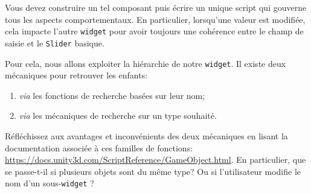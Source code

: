 \documentclass[a4paper,10pt]{article}
\begin{document}
Vous devez construire un tel composant puis écrire un unique script qui gouverne tous les aspects comportementaux. En particulier, lorsqu'une valeur est modifiée, cela impacte l'autre \texttt{widget} pour avoir toujours une cohérence entre le champ de saisie et le \texttt{Slider} basique.

Pour cela, nous allons exploiter la hiérarchie de notre \texttt{widget}. Il existe deux mécaniques pour retrouver les enfants:
\begin{enumerate}
	\item \textit{via} les fonctions de recherche basées sur leur nom;
	\item \textit{via} les mécaniques de recherche sur un type souhaité.
\end{enumerate}
Réfléchissez aux avantages et inconvénients des deux mécaniques en lisant la documentation associée à ces familles de fonctions: \url{https://docs.unity3d.com/ScriptReference/GameObject.html}.
En particulier, que se passe-t-il si plusieurs objets sont du même type? Ou si l'utilisateur modifie le nom d'un sous-\texttt{widget} ?
\end{document}
